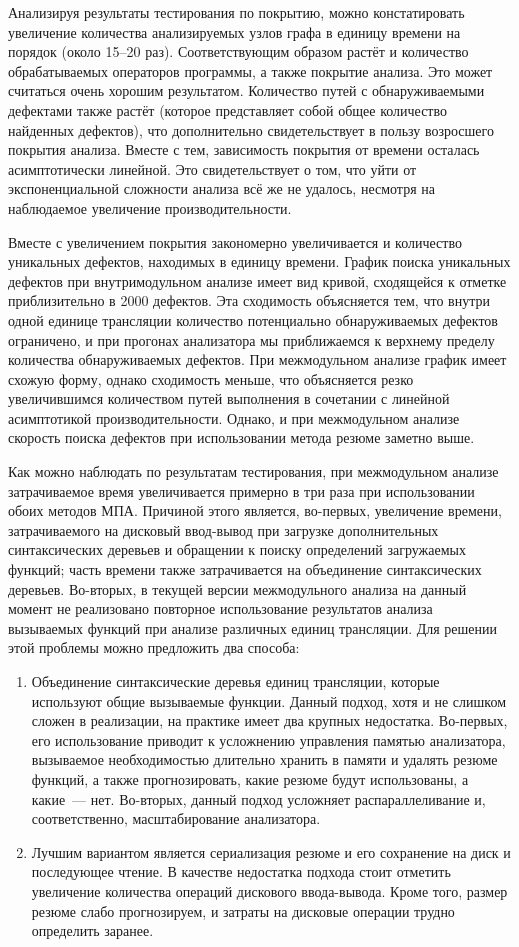Анализируя результаты тестирования по покрытию, можно констатировать увеличение количества анализируемых узлов графа в единицу времени на порядок (около 15--20 раз). Соответствующим образом растёт и количество обрабатываемых операторов программы, а также покрытие анализа. Это может считаться очень хорошим результатом. Количество путей с обнаруживаемыми дефектами также растёт (которое представляет собой общее количество найденных дефектов), что дополнительно свидетельствует в пользу возросшего покрытия анализа. Вместе с тем, зависимость покрытия от времени осталась асимптотически линейной. Это свидетельствует о том, что уйти от экспоненциальной сложности анализа всё же не удалось, несмотря на наблюдаемое увеличение производительности.

Вместе с увеличением покрытия закономерно увеличивается и количество уникальных дефектов, находимых в единицу времени. График поиска уникальных дефектов при внутримодульном анализе имеет вид кривой, сходящейся к отметке приблизительно в 2000 дефектов. Эта сходимость объясняется тем, что внутри одной единице трансляции количество потенциально обнаруживаемых дефектов ограничено, и при прогонах анализатора мы приближаемся к верхнему пределу количества обнаруживаемых дефектов. При межмодульном анализе график имеет схожую форму, однако сходимость меньше, что объясняется резко увеличившимся количеством путей выполнения в сочетании с линейной асимптотикой производительности. Однако, и при межмодульном анализе скорость поиска дефектов при использовании метода резюме заметно выше.

Как можно наблюдать по результатам тестирования, при межмодульном анализе затрачиваемое время увеличивается примерно в три раза при использовании обоих методов МПА. Причиной этого является, во-первых, увеличение времени, затрачиваемого на дисковый ввод-вывод при загрузке дополнительных синтаксических деревьев и обращении к поиску определений загружаемых функций; часть времени также затрачивается на объединение синтаксических деревьев. Во-вторых, в текущей версии межмодульного анализа на данный момент не реализовано повторное использование результатов анализа вызываемых функций при анализе различных единиц трансляции. Для решении этой проблемы можно предложить два способа:
\begin{enumerate}
 \item Объединение синтаксические деревья единиц трансляции, которые используют общие вызываемые функции. Данный подход, хотя и не слишком сложен в реализации, на практике имеет два крупных недостатка. Во-первых, его использование приводит к усложнению управления памятью анализатора, вызываемое необходимостью длительно хранить в памяти и удалять резюме функций, а также прогнозировать, какие резюме будут использованы, а какие~--- нет. Во-вторых, данный подход усложняет распараллеливание и, соответственно, масштабирование анализатора.
 \item Лучшим вариантом является сериализация резюме и его сохранение на диск и последующее чтение. В качестве недостатка подхода стоит отметить увеличение количества операций дискового ввода-вывода. Кроме того, размер резюме слабо прогнозируем, и затраты на дисковые операции трудно определить заранее.
\end{enumerate}

